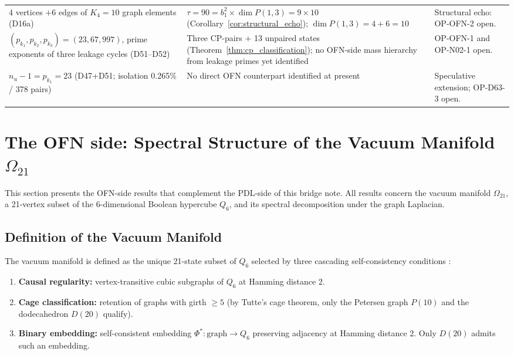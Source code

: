 \documentclass[11pt,a4paper]{article}
\theoremstyle{plain}
\theoremstyle{definition}
\theoremstyle{remark}
\newcommand{\PDL}{\textnormal{PDL}}
\newcommand{\OFN}{\textnormal{OFN}}
\begin{document}
\begin{table}[H]
\begin{tabular}{p{4.0cm}p{4.0cm}p{4.6cm}}
$4$ vertices $+ 6$ edges of $K_4 = 10$ graph elements (D16a) &
$\tau = 90 = b_1^2 \times \dim P(1,3) = 9\times 10$ (Corollary~\ref{cor:structural_echo}); $\dim P(1,3)=4+6=10$ &
\textcolor{hypothesisorange}{Structural echo: OP-OFN-2 open.} \\[0.5em]
$(p_{k_1}, p_{k_2}, p_{k_3}) = (23,67,997)$, prime exponents of three leakage cycles (D51--D52) &
Three CP-pairs $+$ 13 unpaired states (Theorem~\ref{thm:cp_classification}); no OFN-side mass hierarchy from leakage primes yet identified &
\textcolor{hypothesisorange}{OP-OFN-1 and OP-N02-1 open.} \\[0.5em]
$n_u - 1 = p_{k_1} = 23$ (D47+D51; isolation 0.265\% / 378 pairs) &
No direct OFN counterpart identified at present &
\textcolor{hypothesisorange}{Speculative extension; OP-D63-3 open.} \\
\bottomrule
\end{tabular}
\end{table}

\section{The OFN side: Spectral Structure of the Vacuum Manifold \texorpdfstring{$\Omega_{21}$}{Omega21}}
\label{sec:ssr}

This section presents the \OFN-side results that complement the \PDL-side of this bridge note. All results concern the vacuum manifold $\Omega_{21}$, a 21-vertex subset of the 6-dimensional Boolean hypercube $Q_6$, and its spectral decomposition under the graph Laplacian.

\subsection{Definition of the Vacuum Manifold}
\label{sec:vacuum_manifold}

The vacuum manifold is defined as the unique 21-state subset of $Q_6$ selected by three cascading self-consistency conditions \cite{Bachani2026}:
\begin{enumerate}
    \item \textbf{Causal regularity:} vertex-transitive cubic subgraphs of $Q_6$ at Hamming distance 2.
    \item \textbf{Cage classification:} retention of graphs with girth $\geq 5$ (by Tutte's cage theorem, only the Petersen graph $P(10)$ and the dodecahedron $D(20)$ qualify).
    \item \textbf{Binary embedding:} self-consistent embedding $\Phi^*\colon \text{graph} \to Q_6$ preserving adjacency at Hamming distance 2. Only $D(20)$ admits such an embedding.
\end{enumerate}
\end{document}
